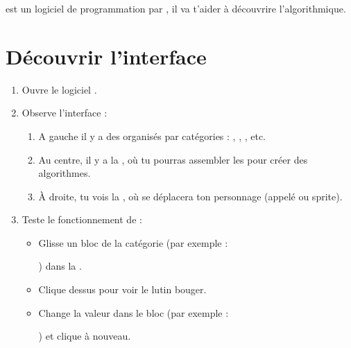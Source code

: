 
\emptyBackground




\Scratch est un logiciel de programmation par \block, il va t'aider à découvrire l'algorithmique.

\section{Découvrir l'interface}

\begin{enumerate}
    \item Ouvre le logiciel \Scratch.
    \item Observe l'interface :
    \begin{enumerate}
        \item A gauche il y a des \block
        organisés par catégories : \smouvement, \sapparance, \ssound, etc.
        \item Au centre, il y a la , où tu pourras assembler les \block pour créer des algorithmes.
        \item À droite, tu vois la  , où se déplacera ton personnage (appelé  ou sprite).  
    \end{enumerate}
    \item Teste le fonctionnement de  \Scratch : 
    \begin{itemize} 
        \item Glisse un bloc de la catégorie \smouvement
        (par exemple :
        \begin{scratch}\end{scratch}
        ) dans la . 
        \item Clique dessus pour voir le lutin bouger. 
        \item Change la valeur dans le bloc
        (par exemple :
        \begin{scratch}\end{scratch}
        ) et clique à nouveau. 
    \end{itemize}
\end{enumerate}

